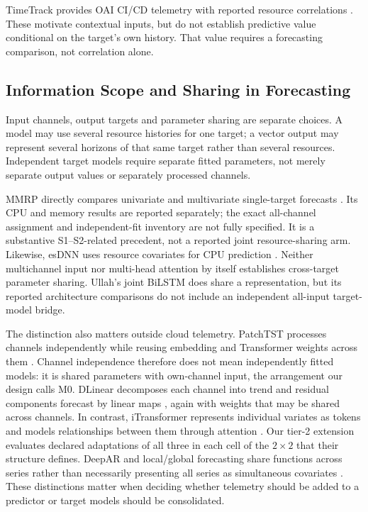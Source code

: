 \documentclass[5p,twocolumn]{elsarticle}
\begin{document}
TimeTrack provides OAI CI/CD telemetry with reported resource correlations
\citep{Meliani2025TimeTrack}. These motivate contextual inputs, but do not
establish predictive value conditional on the target's own history.
That value requires a forecasting comparison, not correlation alone.

\subsection{Information Scope and Sharing in Forecasting}
\label{sec:rw-information-sharing}

Input channels, output targets and parameter sharing are separate choices.
A model may use several resource histories for one target; a vector output
may represent several horizons of that same target rather than several
resources. Independent target models require separate fitted parameters,
not merely separate output values or separately processed channels.

MMRP directly compares univariate and multivariate single-target forecasts
\citep{Tripathi2025MMRP}. Its CPU and memory results are reported separately;
the exact all-channel assignment and independent-fit inventory are not fully
specified. It is a substantive S1--S2-related precedent, not a reported joint
resource-sharing arm. Likewise, esDNN uses resource covariates for CPU
prediction \citep{Xu2022esDNN}. Neither multichannel input nor multi-head
attention by itself establishes cross-target parameter sharing. Ullah's joint
BiLSTM does share a representation, but its reported architecture comparisons
do not include an independent all-input target-model bridge.

The distinction also matters outside cloud telemetry. PatchTST processes
channels independently while reusing embedding and Transformer weights across
them \citep{Nie2023PatchTST}. Channel independence therefore does not mean
independently fitted models: it is shared parameters with own-channel input,
the arrangement our design calls M0. DLinear decomposes each channel into
trend and residual components forecast by linear maps \citep{Zeng2023DLinear},
again with weights that may be shared across channels. In contrast,
iTransformer represents individual variates as tokens and models
relationships between them through attention \citep{Liu2024iTransformer}.
Our tier-2 extension evaluates declared adaptations of all three in each
cell of the $2\times2$ that their structure defines.
DeepAR and local/global forecasting share functions across series rather than
necessarily presenting all series as simultaneous covariates
\citep{Salinas2020DeepAR,MonteroManso2021GlobalForecasting}.
These distinctions matter when deciding whether telemetry should be added to
a predictor or target models should be consolidated.
\end{document}
